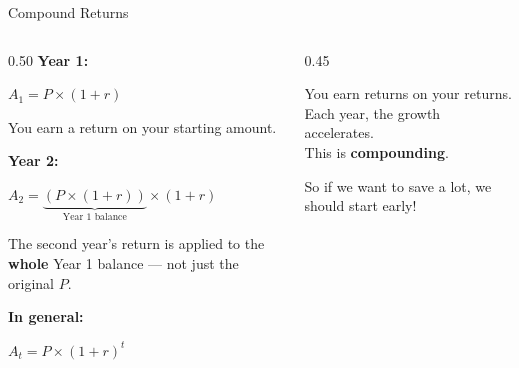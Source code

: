 \documentclass[9pt,english,aspectratio=169]{beamer}
\begin{document}
\begin{frame}{Compound Returns}

  \begin{columns}[T]
    \begin{column}{0.50\textwidth}
      \textbf{Year 1:}

      $A_1 = P \times (1 + r)$

      {\small You earn a return on your starting amount.}

      \pause
      \vspace{0.8em}
      \textbf{Year 2:}

      $A_2 = \underbrace{(P \times (1 + r))}_{\text{Year 1 balance}} \times (1 + r)$

      {\small The second year's return is applied to the \textbf{whole} Year 1 balance --- not just the original $P$.}

      \pause
      \vspace{0.8em}
      \textbf{In general:}
      \begin{methodbox}
        \centering
        {\Large $A_t = P \times (1 + r)^{t}$}
      \end{methodbox}
    \end{column}
    \begin{column}{0.45\textwidth}
      \vspace{0.5em}
      \begin{insightbox}
        You earn returns on your returns. Each year, the growth accelerates. \\
        This is \textbf{compounding}.
      \end{insightbox}
      \pause 
      \vspace{2em}
      \begin{insightbox}
        So if we want to save a lot, we should start early!
      \end{insightbox}
    \end{column}
  \end{columns}

\end{frame}
\end{document}

